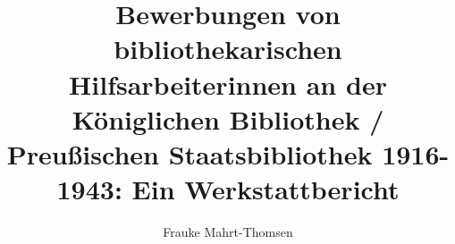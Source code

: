 \fancyhead[R]{\thepage} %

\title{\LARGE{Bewerbungen von bibliothekarischen Hilfsarbeiterinnen an der Königlichen Bibliothek / Preußischen Staatsbibliothek 1916-1943}: Ein Werkstattbericht} %
\author{Frauke Mahrt-Thomsen} %